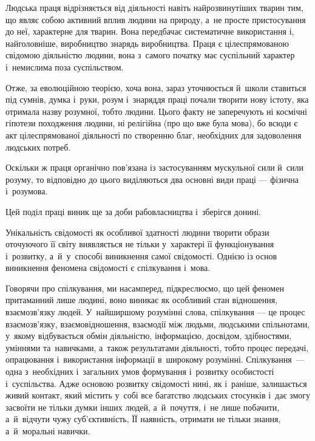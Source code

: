 \documentclass[a5paper,oneside,DIV=12,12pt,headings=small]{scrartcl}
\begin{document}
		Людська праця відрізняється від діяльності навіть найрозвинутіших тварин тим, що являє собою активний вплив людини на природу, а~не просте пристосування до неї, характерне для тварин. Вона передбачає систематичне використання і, найголовніше, виробництво знарядь виробництва. Праця є цілеспрямованою свідомою діяльністю людини, вона з~самого початку має суспільний характер і~немислима поза суспільством.

		Отже, за еволюційною теорією, хоча вона, зараз уточнюється й~школи ставиться під сумнів, думка і~руки, розум і~знаряддя праці почали творити нову істоту, яка отримала назву розумної, тобто людини. Цього факту не заперечують ні космічні гіпотези походження людини, ні релігійна (про що вже була мова), бо всюди є акт цілеспрямованої діяльності по створенню благ, необхідних для задоволення людських потреб.

		Оскільки ж праця органічно пов'\-я\-за\-на із застосуванням мускульної сили й~сили розуму, то відповідно до цього виділяються два основні види праці — фізична і~розумова.

		Цей поділ праці виник ще за доби рабовласництва і~зберігся донині.

		Унікальність свідомості як особливої здатності людини творити образи оточуючого її світу виявляється не тільки у~характері її функціонування і~розвитку, а~й~у~способі виникнення самої свідомості. Однією із основ виникнення феномена свідомості є спілкування і~мова.

		Говорячи про спілкування, ми насамперед, підкреслюємо, що цей феномен притаманний лише людині, воно виникає як особливий стан відношення, вза\-є\-мо\-зв'яз\-ку людей. У~найширшому розумінні слова, спілкування — це процес вза\-є\-мо\-зв'яз\-ку, взаємовідношення, взаємодії між людьми, людськими спільнотами, у~якому відбувається обмін діяльністю, інформацією, досвідом, здібностями, уміннями та~навичками, а~також результатами діяльності, тобто процес передачі, опрацювання і~використання інформації в~широкому розумінні. Спілкування~— одна з~необхідних і~загальних умов формування і~розвитку особистості і~суспільства. Адже основою розвитку свідомості нині, як і~раніше, залишається живий контакт, який містить у~собі все багатство людських стосунків і~дає змогу засвоїти не тільки думки інших людей, а~й~почуття, і~не лише побачити, а~й~відчути чужу суб'\-єктивність, ЇЇ наявність, отримати не тільки знання, а~й~моральні навички.
\end{document}
